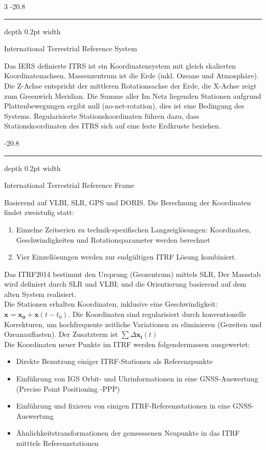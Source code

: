\documentclass[9pt, landscape, fleqn]{scrartcl}
\makeatletter
\renewcommand{\subsubsection}{\@startsection{subsubsection}{1}{0mm}%
{-2\baselineskip}{0.8\baselineskip}%
{\hrule depth 0.2pt width\columnwidth\vspace*{1.2em}\normalsize\bfseries\rmfamily}}
\makeatother
\begin{document}
\begin{multicols*}{3}
\subsubsection{International Terrestrial Reference System}

Das IERS definierte ITRS ist ein Koordinatensystem mit gleich skalierten Koordinatenachsen. Massenzentrum ist die Erde (inkl. Ozeane und Atmosphäre). Die Z-Achse entspricht der mittleren Rotationsachse der Erde, 
die X-Achse zeigt zum Greenwich Meridian. Die Summe aller Im Netz liegenden Stationen aufgrund Plattenbewegungen ergibt null (no-net-rotation), dies ist eine Bedingung des Systems. Regularisierte Stationskoordinaten führen dazu, dass Stationskoordinaten des ITRS sich auf eine feste Erdkruste beziehen.

\subsubsection{International Terrestrial Reference Frame}

Basierend auf VLBI, SLR, GPS und DORIS. Die Berechnung der Koordinaten findet zweistufig statt:

\begin{enumerate}
    \item Einzelne Zeitserien zu technik-spezifischen Langzeiglösungen: Koordinaten, Geschwindigkeiten und Rotationsparameter werden berechnet
    \item Vier Einzellösungen werden zur endgültigen ITRF Lösung kombiniert.
\end{enumerate}

Das ITRF2014 bestimmt den Ursprung (Geozentrum) mittels SLR, Der Massstab wird definiert durch SLR und VLBI; und die Orientierung basierend auf dem alten System realisiert. \\
Die Stationen erhalten Koordinaten, inklusive eine Geschwindigkeit: $\mathbf{x} = \mathbf{x_0} + \mathbf{x}(t-t_0)$. Die Koordinaten sind regularisiert durch konventionelle Korrekturen, um hochfrequente zeitliche Variationen zu eliminieren (Gezeiten und Ozeanauflasten). Der Zusatzterm ist $\sum \Delta \mathbf{x_i}(t)$ \\
Die Koordinaten neuer Punkte im ITRF werden folgendermassen ausgewertet:

\begin{itemize}
    \item Direkte Benutzung einiger ITRF-Stationen als Referenzpunkte
    \item Einführung von IGS Orbit- und Uhrinformationen in eine GNSS-Auswertung (Precise Point Positioning -PPP)
    \item Einführung und fixieren von einigen ITRF-Referenzstationen in eine GNSS-Auswertung
    \item Ähnlichkeitstransformationen der gemesssenen Neupunkte in das ITRF mitttels Referenzstationen
\end{itemize}


\end{multicols*}
\end{document}
